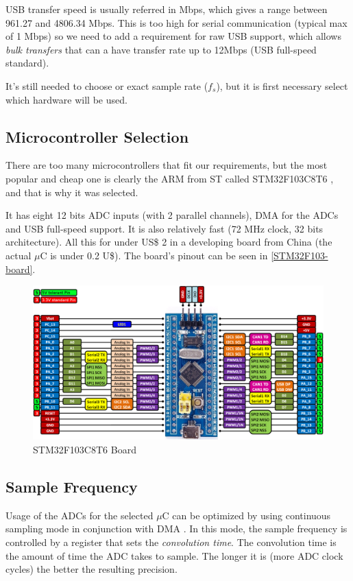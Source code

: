 USB transfer speed is usually referred in Mbps, which gives a range between
961.27 and 4806.34 Mbps. This is too high for serial communication (typical max of
1 Mbps) so we need to add a requirement for raw USB support, which allows \textit{bulk transfers}
that can a have transfer rate up to 12Mbps (USB full-speed standard).

It's still needed to choose or exact sample rate ($f_{s}$), but it is first necessary
select which hardware will be used.

\subsection{Microcontroller Selection}
There are too many microcontrollers that fit our requirements, but the most popular
and cheap one is clearly the ARM from ST called STM32F103C8T6 \cite{STM32F103},
and that is why it was selected. 

It has eight 12 bits ADC inputs (with 2 parallel channels), DMA for the ADCs and USB full-speed support. It is
also relatively fast (72 MHz clock, 32 bits architecture). All this for under US\$ 2
in a developing board from China (the actual $\mu$C is under 0.2 U\$).
The board's pinout can be seen in \autoref{STM32F103-board}.

\begin{figure}[htb]
  \centering
  \caption{STM32F103C8T6 Board}
  \label{STM32F103-board}
  \includegraphics[scale=0.3]{images/STM32F103-board}
\end{figure}

\subsection{Sample Frequency}
\label{firmware-sample-frequency}
Usage of the ADCs for the selected $\mu$C can be optimized by using continuous sampling
mode in conjunction with DMA \cite[ch. 11]{STM32F103}. In this mode, the sample frequency is controlled by a register
that sets the \textit{convolution time}. The convolution time is the amount of time
the ADC takes to sample. The longer it is (more ADC clock cycles) the better the resulting precision.


